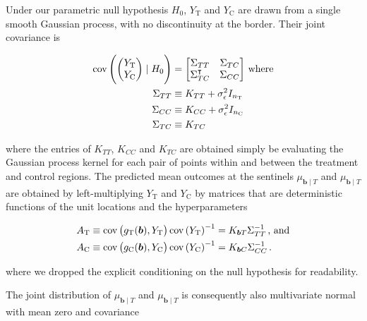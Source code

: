 \documentclass[letter]{article}
\DeclareMathOperator{\cov}{{cov}}
\newcommand{\trans}{^{\intercal}}
\newcommand{\treat}{\mathrm{T}}
\newcommand{\ctrol}{\mathrm{C}}
\newcommand{\sigman}{\sigma_{\epsilon}}
\newcommand{\sentinels}{\bm{b}}
\begin{document}
    	Under our parametric null hypothesis \(H_0\), \(Y_\treat{}\) and \(Y_\ctrol{}\) are drawn from a single smooth Gaussian process, with no discontinuity at the border.
Their joint covariance is

\begin{equation}
\begin{aligned}
    \cov \del{\begin{pmatrix}Y_\treat{} \\ Y_\ctrol{}\end{pmatrix} \mid H_0 } &= \begin{bmatrix}
                        \Sigma_{TT} & \Sigma_{TC} \\
                        \Sigma\trans_{TC} & \Sigma_{CC}
                    \end{bmatrix}\,\text{where} \\
    \Sigma_{TT} &\equiv K_{TT} + \sigman^2 I_{n_\treat{}} \\
    \Sigma_{CC} &\equiv K_{CC} + \sigman^2 I_{n_\ctrol{}} \\
    \Sigma_{TC} &\equiv K_{TC}
\end{aligned}
\end{equation}

where the entries of \(K_{TT}\), \(K_{CC}\) and \(K_{TC}\) are obtained simply be evaluating the Gaussian process kernel for each pair of points within and between the treatment and control regions.
The predicted mean outcomes at the sentinels \(\mu_{\sentinels \mid T}\) and \(\mu_{\sentinels \mid T}\) are obtained by left-multiplying \(Y_\treat{}\) and \(Y_\ctrol{}\) by matrices that are deterministic functions of the unit locations and the hyperparameters

\begin{equation}
\begin{split}
    A_\treat{} &\equiv \cov\del{g_\treat{}(\sentinels), Y_\treat{}} \cov\del{Y_\treat{}}^{-1} = K_{\sentinels T} \Sigma_{TT}^{-1} \,\text{, and} \\
    A_\ctrol{} &\equiv \cov\del{g_\ctrol{}(\sentinels), Y_\ctrol{}} \cov\del{Y_\ctrol{}}^{-1} = K_{\sentinels C} \Sigma_{CC}^{-1}\,.
\end{split}
\end{equation}

where we dropped the explicit conditioning on the null hypothesis for readability.
    


    	The joint distribution of \(\mu_{\sentinels \mid T}\) and \(\mu_{\sentinels \mid T}\) is consequently also multivariate normal with mean zero and covariance
\end{document}
